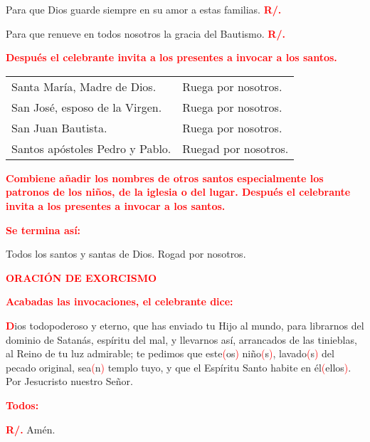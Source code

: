 \documentclass[12pt, letterpaper]{report}
\begin{document}
\Large {Para que Dios guarde siempre en su amor a estas familias.
\hspace{1cm} \bfseries \textcolor{red}{R/.}}

\Large {Para que renueve en todos nosotros la gracia del Bautismo.
\hspace{1cm} \bfseries \textcolor{red}{R/.}}

\large {\bfseries \textcolor{red}{Despu\'es el celebrante invita a los presentes a invocar a los santos.}} 

\Large \begin{tabular}{ll}
Santa Mar\'ia, Madre de Dios.& Ruega por nosotros. \\
San Jos\'e, esposo de la Virgen.& Ruega por nosotros. \\
San Juan Bautista.& Ruega por nosotros. \\
Santos ap\'ostoles Pedro y Pablo.& Ruegad por nosotros.
\end{tabular}

\large {\bfseries \textcolor{red}{Combiene a\~nadir los nombres de otros santos especialmente los patronos de los ni\~nos, de la iglesia o del lugar. Despu\'es el celebrante invita a los presentes a invocar a los santos.}} 

\large {\bfseries \textcolor{red}{Se termina as\'i:}} 

\Large Todos los santos y santas de Dios. Rogad por nosotros. 

\newpage

\Large {\bfseries \textcolor{red}{ORACI\'ON DE EXORCISMO}} 

\large {\bfseries \textcolor{red}{Acabadas las invocaciones, el celebrante dice:}} 

\lettrine[lines=1]{\bfseries \textcolor{red}{D}}{}\Large ios todopoderoso y eterno, que has enviado tu Hijo al mundo, para librarnos del dominio de Satan\'as, esp\'iritu del mal, y llevarnos as\'i, arrancados de las tinieblas, al Reino de tu luz admirable; te pedimos que este\textcolor{red}{(}os\textcolor{red}{)} ni\~no\textcolor{red}{(}s\textcolor{red}{)}, lavado\textcolor{red}{(}s\textcolor{red}{)} del pecado original, sea\textcolor{red}{(}n\textcolor{red}{)} templo tuyo, y que el Esp\'iritu Santo habite en \'el\textcolor{red}{(}ellos\textcolor{red}{)}. Por Jesucristo nuestro Se\~nor.

\large {\bfseries \textcolor{red}{Todos:}}

\noindent
\Large {\bfseries \textcolor{red}{R/.}} \hspace{0.5cm} Am\'en.
\end{document}
